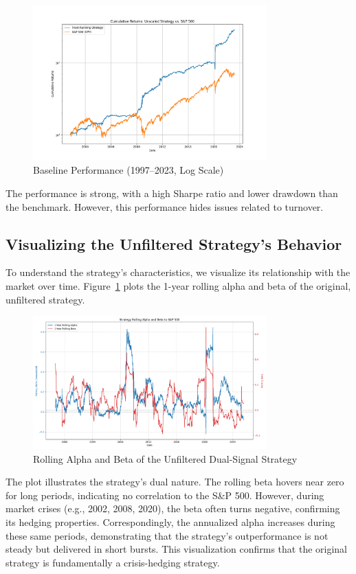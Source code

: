 \documentclass{article}
\begin{document}
\begin{figure}[htbp]
\centering
\includegraphics[width=0.8\textwidth]{performance.png}
\caption{Baseline Performance (1997--2023, Log Scale)}
\end{figure}

The performance is strong, with a high Sharpe ratio and lower drawdown than the benchmark. However, this performance hides issues related to turnover.

\subsection{Visualizing the Unfiltered Strategy's Behavior}
To understand the strategy's characteristics, we visualize its relationship with the market over time. Figure~\ref{fig:rolling_metrics} plots the 1-year rolling alpha and beta of the original, unfiltered strategy.

\begin{figure}[htbp]
    \centering
    \includegraphics[width=0.8\textwidth]{plot_rolling_metrics.png}
    \caption{Rolling Alpha and Beta of the Unfiltered Dual-Signal Strategy}
    \label{fig:rolling_metrics}
\end{figure}

The plot illustrates the strategy's dual nature. The rolling beta hovers near zero for long periods, indicating no correlation to the S\&P 500. However, during market crises (e.g., 2002, 2008, 2020), the beta often turns negative, confirming its hedging properties. Correspondingly, the annualized alpha increases during these same periods, demonstrating that the strategy's outperformance is not steady but delivered in short bursts. This visualization confirms that the original strategy is fundamentally a crisis-hedging strategy.
\end{document}
